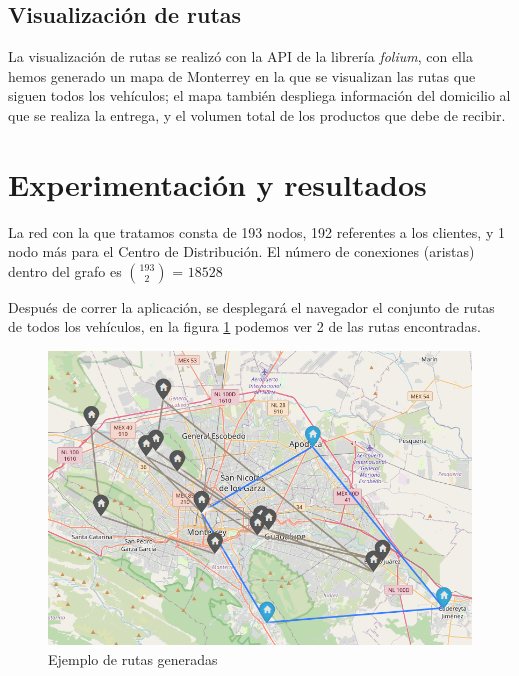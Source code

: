 \documentclass[journal]{IEEEtran}
\begin{document}
        \subsection{Visualización de rutas} 
            
            La visualización de rutas se realizó con la API de la librería \emph{folium}, con ella hemos generado un mapa de Monterrey en la que se visualizan las rutas que siguen todos los vehículos; el mapa también despliega información del domicilio al que se realiza la entrega, y el volumen total de los productos que debe de recibir.
            
    \section{Experimentación y resultados}
    
        La red con la que tratamos consta de 193 nodos, 192 referentes a los clientes, y 1 nodo más para el Centro de Distribución. El número de conexiones (aristas) dentro del grafo es $193\choose2$ = $18528$
    
        Después de correr la aplicación, se desplegará el navegador el conjunto de rutas de todos los vehículos, en la figura \ref{generated-routes} podemos ver 2 de las rutas encontradas.
    
        \begin{figure}[H]
            \centering
            \includegraphics[scale=0.3]{img/rutas-generadas.png}
            \caption{Ejemplo de rutas generadas} 
            \label{generated-routes}
        \end{figure}
        
\end{document}
